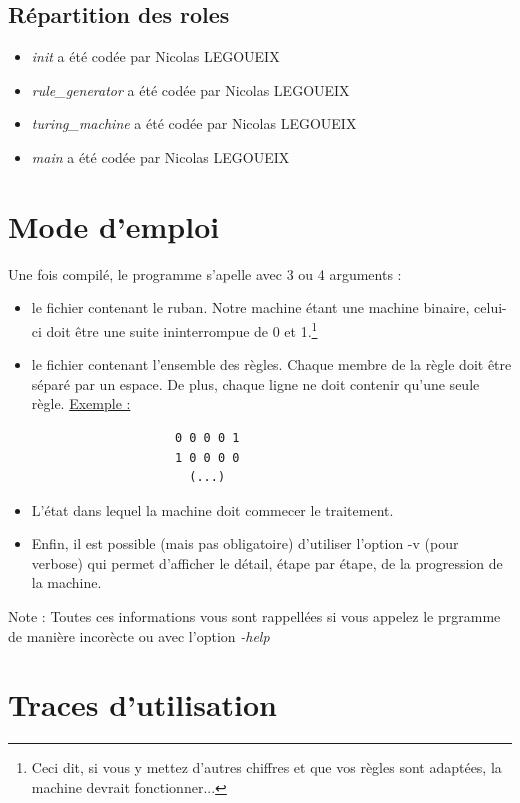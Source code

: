 \documentclass[12pt,a4paper]{report}
\begin{document}
\section{Répartition des roles}
\begin{itemize}
\item \textit{init} a été codée par Nicolas LEGOUEIX
\item \textit{rule\_generator} a été codée par Nicolas LEGOUEIX
\item \textit{turing\_machine} a été codée par Nicolas LEGOUEIX
\item \textit{main} a été codée par Nicolas LEGOUEIX
\end{itemize}
\chapter{Mode d'emploi}
Une fois compilé, le programme s'apelle avec 3 ou 4 arguments :
\begin{itemize}
\item le fichier contenant le ruban. Notre machine étant une machine binaire, celui-ci doit être une suite ininterrompue de 0 et 1.\footnote{Ceci dit, si vous y mettez d'autres chiffres et que vos règles sont adaptées, la machine devrait fonctionner...}
\item le fichier contenant l'ensemble des règles. Chaque membre de la règle doit être séparé par un espace. De plus, chaque ligne ne doit contenir qu'une seule règle.
\underline{Exemple :}
\begin{center}
\begin{lstlisting}
                    0 0 0 0 1
                    1 0 0 0 0
                      (...)
\end{lstlisting}
\end{center}
\item L'état dans lequel la machine doit commecer le traitement.
\label{chap:emploi}
\item Enfin, il est possible (mais pas obligatoire) d'utiliser l'option -v (pour verbose) qui permet d'afficher le détail, étape par étape, de la progression de la machine.
\end{itemize}
Note : Toutes ces informations vous sont rappellées si vous appelez le prgramme de manière incorècte ou avec l'option \textit{-help}
\chapter{Traces d'utilisation}
\end{document}
